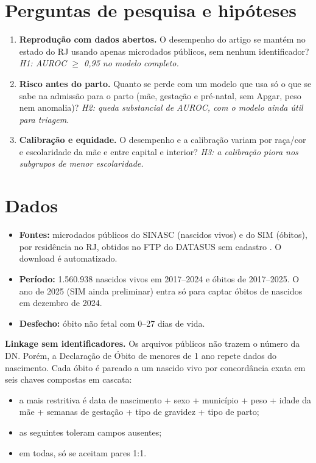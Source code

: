 \documentclass[12pt]{article}
\begin{document}
\section{Perguntas de pesquisa e hipóteses}

\begin{enumerate}
  \item \textbf{Reprodução com dados abertos.} O desempenho do artigo se mantém no estado do RJ usando apenas microdados públicos, sem nenhum identificador? \textit{H1: AUROC $\geq$ 0,95 no modelo completo.}
  \item \textbf{Risco antes do parto.} Quanto se perde com um modelo que usa só o que se sabe na admissão para o parto (mãe, gestação e pré-natal, sem Apgar, peso nem anomalia)? \textit{H2: queda substancial de AUROC, com o modelo ainda útil para triagem.}
  \item \textbf{Calibração e equidade.} O desempenho e a calibração variam por raça/cor e escolaridade da mãe e entre capital e interior? \textit{H3: a calibração piora nos subgrupos de menor escolaridade.}
\end{enumerate}

\section{Dados}

\begin{itemize}
  \item \textbf{Fontes:} microdados públicos do SINASC (nascidos vivos) e do SIM (óbitos), por residência no RJ, obtidos no FTP do DATASUS sem cadastro \cite{datasus}. O download é automatizado.
  \item \textbf{Período:} 1.560.938 nascidos vivos em 2017--2024 e óbitos de 2017--2025. O ano de 2025 (SIM ainda preliminar) entra só para captar óbitos de nascidos em dezembro de 2024.
  \item \textbf{Desfecho:} óbito não fetal com 0--27 dias de vida.
\end{itemize}

\textbf{Linkage sem identificadores.} Os arquivos públicos não trazem o número da DN. Porém, a Declaração de Óbito de menores de 1 ano repete dados do nascimento. Cada óbito é pareado a um nascido vivo por concordância exata em seis chaves compostas em cascata:
\begin{itemize}
  \item a mais restritiva é data de nascimento + sexo + município + peso + idade da mãe + semanas de gestação + tipo de gravidez + tipo de parto;
  \item as seguintes toleram campos ausentes;
  \item em todas, só se aceitam pares 1:1.
\end{itemize}
\end{document}
